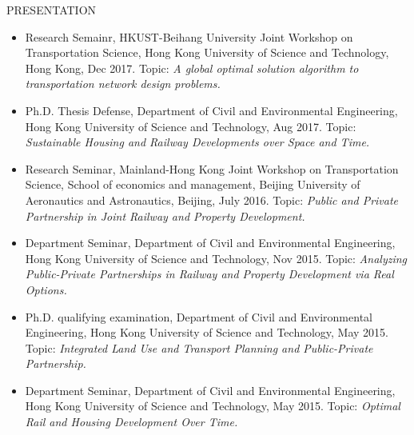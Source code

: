 \documentclass{resume} %
\begin{document}
\begin{rSection}{PRESENTATION}
\begin{itemize}
\item Research Semainr, HKUST-Beihang University Joint Workshop on Transportation
Science, Hong Kong University of Science and Technology, Hong Kong, Dec 2017. Topic:
\textit{A global optimal solution algorithm to transportation network design problems.}
\item Ph.D. Thesis Defense, Department of Civil and Environmental Engineering, Hong
Kong University of Science and Technology, Aug 2017. Topic: \textit{Sustainable Housing and
Railway Developments over Space and Time.}
\item Research Seminar, Mainland-Hong Kong Joint Workshop on Transportation
Science, School of economics and management, Beijing University of Aeronautics and
Astronautics, Beijing, July 2016. Topic: \textit{Public and Private Partnership in Joint Railway
and Property Development.}
\item Department Seminar, Department of Civil and Environmental Engineering, Hong
Kong University of Science and Technology, Nov 2015. Topic: \textit{Analyzing Public-Private
Partnerships in Railway and Property Development via Real Options.}
\item Ph.D. qualifying examination, Department of Civil and Environmental
Engineering, Hong Kong University of Science and Technology, May 2015. Topic:
\textit{Integrated Land Use and Transport Planning and Public-Private Partnership.}
\item Department Seminar, Department of Civil and Environmental Engineering, Hong
Kong University of Science and Technology, May 2015. Topic: \textit{Optimal Rail and Housing
Development Over Time.}
\end{itemize}
\end{rSection}
\end{document}
